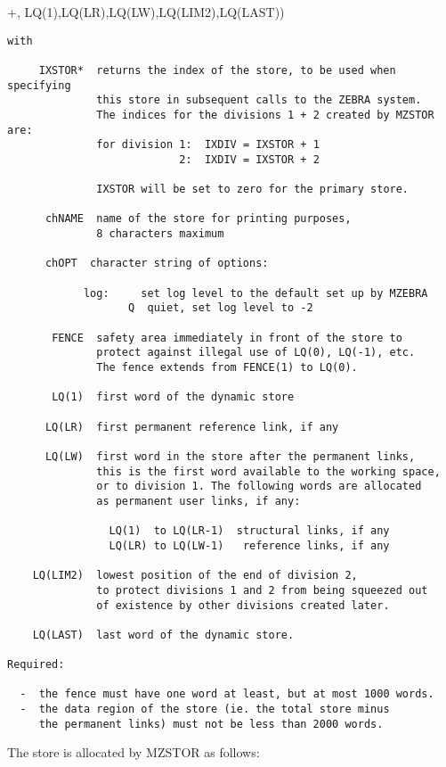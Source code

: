        {+,            LQ(1),LQ(LR),LQ(LW),LQ(LIM2),LQ(LAST))}
\begin{verbatim}
with

     IXSTOR*  returns the index of the store, to be used when specifying
              this store in subsequent calls to the ZEBRA system.
              The indices for the divisions 1 + 2 created by MZSTOR are:
              for division 1:  IXDIV = IXSTOR + 1
                           2:  IXDIV = IXSTOR + 2

              IXSTOR will be set to zero for the primary store.

      chNAME  name of the store for printing purposes,
              8 characters maximum

      chOPT  character string of options:

            log:     set log level to the default set up by MZEBRA
                   Q  quiet, set log level to -2

       FENCE  safety area immediately in front of the store to
              protect against illegal use of LQ(0), LQ(-1), etc.
              The fence extends from FENCE(1) to LQ(0).

       LQ(1)  first word of the dynamic store

      LQ(LR)  first permanent reference link, if any

      LQ(LW)  first word in the store after the permanent links,
              this is the first word available to the working space,
              or to division 1. The following words are allocated
              as permanent user links, if any:

                LQ(1)  to LQ(LR-1)  structural links, if any
                LQ(LR) to LQ(LW-1)   reference links, if any

    LQ(LIM2)  lowest position of the end of division 2,
              to protect divisions 1 and 2 from being squeezed out
              of existence by other divisions created later.

    LQ(LAST)  last word of the dynamic store.

Required:

  -  the fence must have one word at least, but at most 1000 words.
  -  the data region of the store (ie. the total store minus
     the permanent links) must not be less than 2000 words.
\end{verbatim} 

The store is allocated by MZSTOR as follows:

